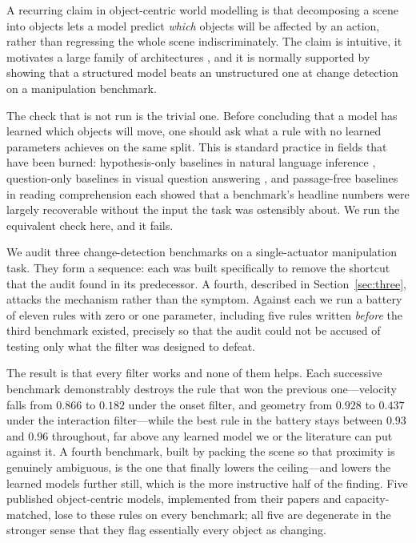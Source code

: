 \documentclass{article}
\begin{document}
A recurring claim in object-centric world modelling is that decomposing a scene into objects
lets a model predict \emph{which} objects will be affected by an action, rather than
regressing the whole scene indiscriminately. The claim is intuitive, it motivates a large
family of architectures \citep{battaglia2016interaction,chang2017npe,kipf2020cswm,wu2023slotformer,goyal2021nps},
and it is normally supported by showing that a structured model beats an unstructured one at
change detection on a manipulation benchmark.

The check that is not run is the trivial one. Before concluding that a model has learned which
objects will move, one should ask what a rule with no learned parameters achieves on the same
split. This is standard practice in fields that have been burned: hypothesis-only baselines in
natural language inference \citep{poliak2018hypothesis,gururangan2018artifacts}, question-only
baselines in visual question answering \citep{agrawal2018vqacp,goyal2017vqav2}, and
passage-free baselines in reading comprehension \citep{kaushik2018reading} each showed that a
benchmark's headline numbers were largely recoverable without the input the task was ostensibly
about. We run the equivalent check here, and it fails.

We audit three change-detection benchmarks on a single-actuator manipulation task. They
form a sequence: each was built specifically to remove the shortcut that the audit found in its
predecessor. A fourth, described in Section~\ref{sec:three}, attacks the mechanism rather than
the symptom. Against each we run a battery of eleven rules with zero or one parameter,
including five rules written \emph{before} the third benchmark existed, precisely so that the
audit could not be accused of testing only what the filter was designed to defeat.

The result is that every filter works and none of them helps. Each successive benchmark
demonstrably destroys the rule that won the previous one---velocity falls from $0.866$ to
$0.182$ under the onset filter, and geometry from $0.928$ to $0.437$ under the interaction
filter---while the best rule in the battery stays between $0.93$ and $0.96$ throughout, far
above any learned model we or the literature can put against it. A fourth benchmark, built by
packing the scene so that proximity is genuinely ambiguous, is the one that finally lowers the
ceiling---and lowers the learned models further still, which is the more instructive half of
the finding. Five published
object-centric models, implemented from their papers and capacity-matched, lose to these rules
on every benchmark; all five are degenerate in the stronger sense that they flag essentially
every object as changing.
\end{document}
